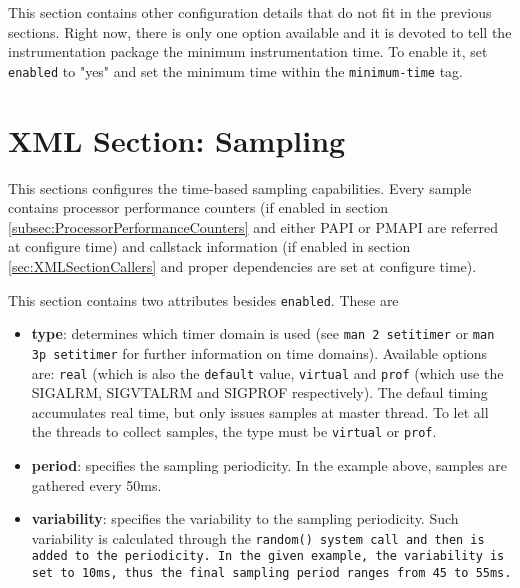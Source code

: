 

This section contains other configuration details that do not fit in the previous sections. Right now, there is only one option available and it is devoted to tell the instrumentation package the minimum instrumentation time. To enable it, set {\tt enabled} to "yes" and set the minimum time within the {\tt minimum-time} tag.

\section{XML Section: Sampling}\label{sec:XMLSectionSampling}



This sections configures the time-based sampling capabilities. Every sample contains processor performance counters (if enabled in section \ref{subsec:ProcessorPerformanceCounters} and either PAPI or PMAPI are referred at configure time) and callstack information (if enabled in section \ref{sec:XMLSectionCallers} and proper dependencies are set at configure time).

This section contains two attributes besides {\tt enabled}. These are
\begin{itemize}
 \item {\bf type}: determines which timer domain is used (see {\tt man 2 setitimer} or {\tt man 3p setitimer} for further information on time domains). Available options are: {\tt real} (which is also the {\tt default} value, {\tt virtual} and {\tt prof} (which use the SIGALRM, SIGVTALRM and SIGPROF respectively). The defaul timing accumulates real time, but only issues samples at master thread. To let all the threads to collect samples, the type must be {\tt virtual} or {\tt prof}.
 \item {\bf period}: specifies the sampling periodicity. In the example above, samples are gathered every 50ms.
 \item {\bf variability}: specifies the variability to the sampling periodicity. Such variability is calculated through the {\tt random() system call and then is added to the periodicity. In the given example, the variability is set to 10ms, thus the final sampling period ranges from 45 to 55ms.}
\end{itemize}


